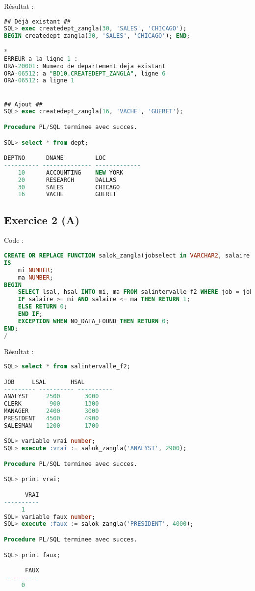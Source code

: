 \documentclass{article}
\begin{document}
Résultat :
\begin{lstlisting}[language=SQL,
    morekeywords={DECLARE, LOOP, TYPE, FOR, IF, IS, OPEN, FETCH, DBMS_OUTPUT, PUT_LINE}]
## Déjà existant ##
SQL> exec createdept_zangla(30, 'SALES', 'CHICAGO');
BEGIN createdept_zangla(30, 'SALES', 'CHICAGO'); END;

*
ERREUR a la ligne 1 :
ORA-20001: Numero de departement deja existant
ORA-06512: a "BD10.CREATEDEPT_ZANGLA", ligne 6
ORA-06512: a ligne 1


## Ajout ##
SQL> exec createdept_zangla(16, 'VACHE', 'GUERET');

Procedure PL/SQL terminee avec succes.

SQL> select * from dept;

DEPTNO 	    DNAME	      LOC
---------- -------------- -------------
    10 		ACCOUNTING	  NEW YORK
    20 		RESEARCH	  DALLAS
    30 		SALES	      CHICAGO
    16 		VACHE	      GUERET    
\end{lstlisting}

\subsection{Exercice 2 (A)}
Code :
\begin{lstlisting}[language=SQL,
    deletekeywords={char},
    morekeywords={DECLARE, LOOP, TYPE, FOR, IF, IS, OPEN, FETCH, DBMS_OUTPUT, PUT_LINE}]
CREATE OR REPLACE FUNCTION salok_zangla(jobselect in VARCHAR2, salaire in NUMBER) RETURN NUMBER 
IS
    mi NUMBER;
    ma NUMBER;
BEGIN
    SELECT lsal, hsal INTO mi, ma FROM salintervalle_f2 WHERE job = jobselect;
    IF salaire >= mi AND salaire <= ma THEN RETURN 1; 
    ELSE RETURN 0;
    END IF;
    EXCEPTION WHEN NO_DATA_FOUND THEN RETURN 0;
END;
/
\end{lstlisting}

Résultat :
\begin{lstlisting}[language=SQL,
    morekeywords={DECLARE, LOOP, TYPE, FOR, IF, IS, OPEN, FETCH, DBMS_OUTPUT, PUT_LINE}]
SQL> select * from salintervalle_f2;

JOB		LSAL	   HSAL
--------- ---------- ----------
ANALYST 	2500	   3000
CLERK		 900	   1300
MANAGER 	2400	   3000
PRESIDENT	4500	   4900
SALESMAN	1200	   1700

SQL> variable vrai number;
SQL> execute :vrai := salok_zangla('ANALYST', 2900);

Procedure PL/SQL terminee avec succes.

SQL> print vrai;

      VRAI
----------
	 1
SQL> variable faux number;
SQL> execute :faux := salok_zangla('PRESIDENT', 4000);

Procedure PL/SQL terminee avec succes.

SQL> print faux;

      FAUX
----------
	 0
\end{lstlisting}
\end{document}
